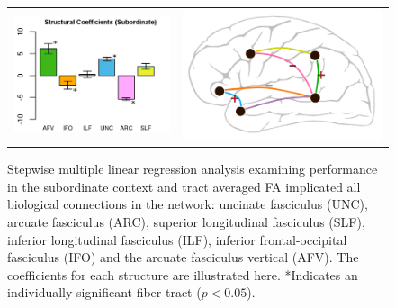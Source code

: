 \documentclass[final,authoryear,5p,times,twocolumn]{elsarticle}
\begin{document}
\begin{figure}[h]
\begin{center}
\begin{tabular}{ c c }
\includegraphics[width=0.45\linewidth]{figures/FA_Subordinate2.png} &
\includegraphics[width=0.45\linewidth]{figures/struct_diag2.png}
\end{tabular}
\caption{Stepwise multiple linear regression analysis examining performance in the subordinate context and tract averaged FA implicated all biological connections in the network: uncinate fasciculus (UNC), arcuate fasciculus (ARC), superior longitudinal fasciculus (SLF), inferior longitudinal fasciculus (ILF), inferior frontal-occipital fasciculus (IFO) and the arcuate fasciculus vertical (AFV). The coefficients for each structure are illustrated here. *Indicates an individually significant fiber tract ($p<0.05$).}
\label{fig:mlr_fa}
\end{center}
\end{figure}
\end{document}
